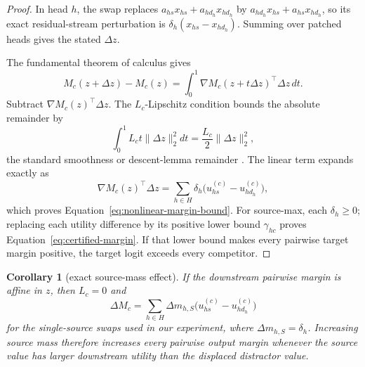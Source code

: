 \documentclass[letterpaper]{article} %
\newtheorem{corollary}[proposition]{Corollary}
\begin{document}
\begin{proof}
In head $h$, the swap replaces
$a_{hs}x_{hs}+a_{h d_h}x_{h d_h}$ by
$a_{h d_h}x_{hs}+a_{hs}x_{h d_h}$, so its exact residual-stream perturbation is
$\delta_h(x_{hs}-x_{h d_h})$. Summing over patched heads gives the stated $\Delta z$.

The fundamental theorem of calculus gives
\begin{equation}
M_c(z+\Delta z)-M_c(z)
=\int_0^1\nabla M_c(z+t\Delta z)^\top\Delta z\,dt.
\end{equation}
Subtract $\nabla M_c(z)^\top\Delta z$. The $L_c$-Lipschitz condition bounds the absolute remainder by
\begin{equation}
\int_0^1 L_ct\lVert\Delta z\rVert_2^2dt
=\frac{L_c}{2}\lVert\Delta z\rVert_2^2,
\end{equation}
the standard smoothness or descent-lemma remainder \citep{nesterov2004}.
The linear term expands exactly as
\begin{equation}
\nabla M_c(z)^\top\Delta z
=\sum_{h\in H}\delta_h
\big(u_{hs}^{(c)}-u_{h d_h}^{(c)}\big),
\end{equation}
which proves Equation~\ref{eq:nonlinear-margin-bound}. For source-max, each $\delta_h\ge0$; replacing each
utility difference by its positive lower bound $\gamma_{hc}$ proves Equation~\ref{eq:certified-margin}.
If that lower bound makes every pairwise target margin positive, the target logit exceeds every competitor.
\end{proof}

\begin{corollary}[exact source-mass effect]
\label{cor:source-mass}
If the downstream pairwise margin is affine in $z$, then $L_c=0$ and
\begin{equation}
\Delta M_c
=\sum_{h\in H}\Delta m_{h,S}
\big(u_{hs}^{(c)}-u_{h d_h}^{(c)}\big)
\end{equation}
for the single-source swaps used in our experiment, where $\Delta m_{h,S}=\delta_h$.
Increasing source mass therefore increases every pairwise output margin whenever the source value has larger
downstream utility than the displaced distractor value.
\end{corollary}
\end{document}
